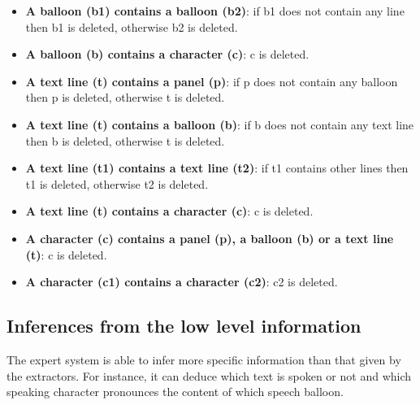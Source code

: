 {\begin{itemize}
	\item \textbf{A balloon (b1) contains a balloon (b2)}: if b1 does not contain any line then b1 is deleted, otherwise b2 is deleted.
	\item \textbf{A balloon (b) contains a character (c)}: c is deleted.
 	\item \textbf{A text line (t) contains a panel (p)}: if p does not contain any balloon then p is deleted, otherwise t is deleted.
 	\item \textbf{A text line (t) contains a balloon (b)}: if b does not contain any text line then b is deleted, otherwise t is deleted.
 	\item \textbf{A text line (t1) contains a text line (t2)}: if t1 contains other lines then t1 is deleted, otherwise t2 is deleted.
 	\item \textbf{A text line (t) contains a character (c)}: c is deleted.
 	\item \textbf{A character (c) contains a panel (p), a balloon (b) or a text line (t)}: c is deleted. 	
 	\item \textbf{A character (c1) contains a character (c2)}: c2 is deleted.
\end{itemize}
}

\subsection{Inferences from the low level information} %
\label{sub:inference_from_low_level}

The expert system is able to infer more specific information than that given by the extractors.
For instance, it can deduce which text is spoken or not and which speaking character pronounces the content of which speech balloon.




